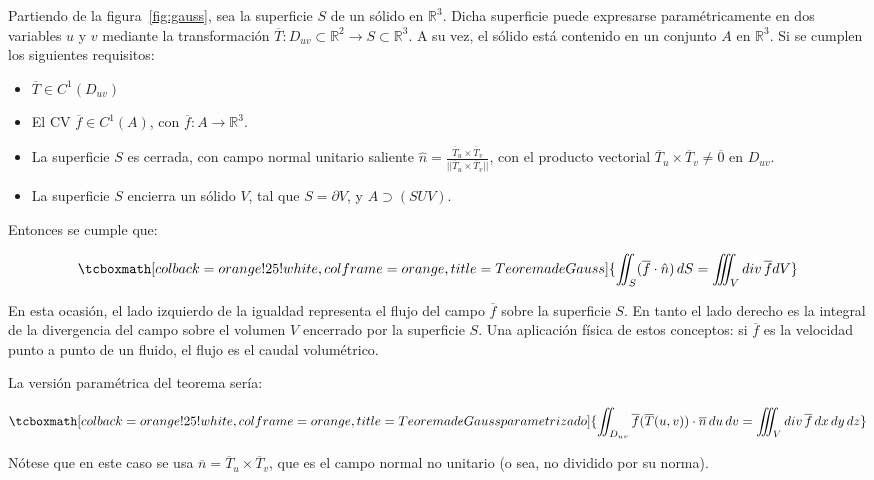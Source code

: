 \documentclass{article}
\renewcommand{\Bbb}{\mathbb}
\begin{document}
Partiendo de la figura~\ref{fig:gauss}, sea la superficie $S$ de un sólido en $\Bbb R^3$. Dicha superficie puede expresarse paramétricamente en dos variables $u$ y $v$ mediante la transformación $\overline{T}:D_{uv} \subset \Bbb R^2 \rightarrow S \subset \Bbb R^3$. A su vez, el sólido está contenido en un conjunto $A$ en $\Bbb R^3$. Si se cumplen los siguientes requisitos:

\begin{itemize}
\item $\overline{T} \in C^1(D_{uv})$
\item El CV $\overline{f} \in C^1(A)$, con $\overline{f}: A \rightarrow \Bbb R^3$.
\item La superficie $S$ es cerrada, con campo normal unitario saliente $\hat{n} = \frac{\overline{T}_u \times \overline{T}_v}{||\overline{T}_u \times \overline{T}_v||}$, con el producto vectorial $\overline{T}_u \times \overline{T}_v \neq \overline{0}$ en $D_{uv}$.
\item La superficie $S$ encierra un sólido $V$, tal que $S = \partial V$, y $A \supset (S U V)$.
\end{itemize}

Entonces se cumple que:

\begin{equation}
\tcboxmath[colback=orange!25!white,colframe=orange, title=Teorema de Gauss]
{ \iint_S ( \overline{f} \cdot \hat{n} ) \mathop{dS} = \iiint_V \mathop{div} \overline{f} dV }
\end{equation}

En esta ocasión, el lado izquierdo de la igualdad representa el flujo del campo $\overline{f}$ sobre la superficie $S$. En tanto el lado derecho es la integral de la divergencia del campo sobre el volumen $V$ encerrado por la superficie $S$. Una aplicación física de estos conceptos: si $\overline{f}$ es la velocidad punto a punto de un fluido, el flujo es el caudal volumétrico.

La versión paramétrica del teorema sería:

\begin{equation}
\tcboxmath[colback=orange!25!white,colframe=orange, title=Teorema de Gauss parametrizado]
{ \iint_{D_{uv}} \overline{f}(\overline{T}(u,v)) \cdot \overline{n} \mathop{du} \mathop{dv} = \iiint_V \mathop{div} \overline{f} \mathop{dx} \mathop{dy} \mathop{dz} }
\end{equation}

Nótese que en este caso se usa $\overline{n} = \overline{T}_u \times \overline{T}_v$, que es el campo normal no unitario (o sea, no dividido por su norma).
\end{document}
